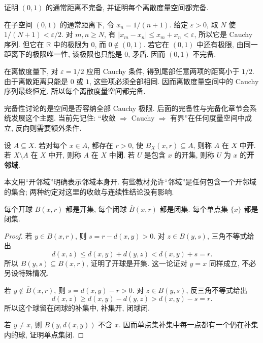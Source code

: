 \begin{example}
证明 $(0,1)$ 的通常距离不完备, 并证明每个离散度量空间都完备.
\end{example}
\begin{solution}
在子空间 $(0,1)$ 的通常距离下, 令 $x_n=1/(n+1)$. 给定 $\varepsilon>0$, 取 $N$ 使 $1/(N+1)<\varepsilon/2$. 对 $m,n\ge N$, 有 $|x_m-x_n|\le x_m+x_n<\varepsilon$, 所以它是 Cauchy 序列. 但它在 $\mathbb{R}$ 中的极限为 $0$, 而 $0\notin(0,1)$. 若它在 $(0,1)$ 中还有极限, 由同一距离下的极限唯一性, 该极限也只能是 $0$, 矛盾. 因而 $(0,1)$ 不完备.

在离散度量下, 对 $\varepsilon=1/2$ 应用 Cauchy 条件, 得到尾部任意两项的距离小于 $1/2$. 由于离散距离只能是 $0$ 或 $1$, 这些项必须全部相同. 因而离散度量空间中的 Cauchy 序列最终恒定, 所以每个离散度量空间都完备.
\end{solution}
完备性讨论的是空间是否容纳全部 Cauchy 极限. 后面的完备性与完备化章节会系统发展这个主题. 当前先记住: ``收敛 $\Rightarrow$ Cauchy $\Rightarrow$ 有界''在任何度量空间中成立, 反向则需要额外条件.

\label{ch:seq:open-closed}
\begin{definition}[开集与闭集]\label{ch:seq:def-open}
设 $A\subseteq X$. 若对每个 $x\in A$, 都存在 $r>0$, 使 $B_X(x,r)\subseteq A$, 则称 $A$ 在 $X$ 中\textbf{开}. 若 $X\setminus A$ 在 $X$ 中开, 则称 $A$ 在 $X$ 中\textbf{闭}. 若 $U$ 是包含 $x$ 的开集, 则称 $U$ 为 $x$ 的\textbf{开邻域}.
\end{definition}
本文用``开邻域''明确表示邻域本身开. 有些教材允许``邻域''是任何包含一个开邻域的集合; 两种约定对这里的收敛与连续性结论没有影响.

\begin{proposition}[开球与闭球]\label{ch:seq:balls-open}
每个开球 $B(x,r)$ 都是开集, 每个闭球 $\overline B(x,r)$ 都是闭集. 每个单点集 $\{x\}$ 都是闭集.
\end{proposition}
\begin{proof}
若 $y\in B(x,r)$, 则 $s=r-d(x,y)>0$. 对 $z\in B(y,s)$, 三角不等式给出
\[
 d(x,z)\le d(x,y)+d(y,z)<d(x,y)+s=r.
\]
所以 $B(y,s)\subseteq B(x,r)$, 证明了开球是开集. 这一论证对 $y=x$ 同样成立, 不必另设特殊情况.

若 $y\notin\overline B(x,r)$, 则 $s=d(x,y)-r>0$. 对 $z\in B(y,s)$, 反三角不等式给出
\[
 d(x,z)\ge d(x,y)-d(y,z)>d(x,y)-s=r.
\]
所以这个球留在闭球的补集中, 补集开, 闭球闭.

若 $y\ne x$, 则 $B(y,d(x,y))$ 不含 $x$. 因而单点集补集中每一点都有一个仍在补集内的球, 证明单点集闭.
\end{proof}

